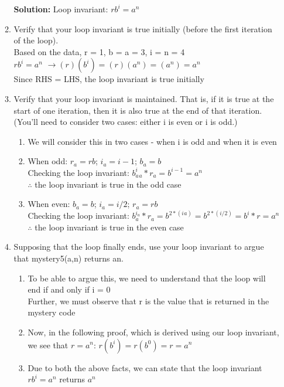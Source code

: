 \documentclass[11pt]{article}
\begin{document}
\begin{enumerate}
\begin{enumerate}
        \textbf{Solution:} Loop invariant: $rb^{i} = a^n$ \\
        
        \item Verify that your loop invariant is true initially (before the first iteration of the loop).
        \\Based on the data, r = 1, b = a = 3, i = n = 4\\
        $rb^{i} = a^n$ $\rightarrow (r)(b^{i}) = (r)(a^n) = (a^n) = a^n$\\
        Since RHS = LHS, the loop invariant is true initially
        

        \item Verify that your loop invariant is maintained. That is, if it is true at the start of one iteration, then it is also true at the end of that iteration. (You'll need to consider two cases: either i is even or i is odd.)
        \begin{enumerate}
            \item We will consider this in two cases - when i is odd and when it is even
            \item When odd: $r_{a} = rb$; $i_{a} = i - 1$; $b_{a} = b$ \\
            Checking the loop invariant: $b_{a}^i_{a} * r_{a} = b^{i-1} = a^n$\\
            $\therefore$ the loop invariant is true in the odd case
            
            \item When even: $b_{a} = b$; $i_{a} = i/2$; $r_{a} = rb$\\
            Checking the loop invariant: $b_{a}^{i_{a}} * r_{a} = b^{2*(i_{}a)} = b^{2*(i/2)} = b^i*r =  a^n$\\
            $\therefore$ the loop invariant is true in the even case
        \end{enumerate}

        \item Supposing that the loop finally ends, use your loop invariant to argue that mystery5(a,n) returns an.
        \begin{enumerate}
            \item To be able to argue this, we need to understand that the loop will end if and only if i = 0\\
            Further, we must observe that r is the value that is returned in the mystery code
            \item Now, in the following proof, which is derived using our loop invariant, we see that $r = a^n$: $r(b^i) = r(b^0) = r = a^n$\\
            \item Due to both the above facts, we can state that the loop invariant $rb^{i} = a^n$ returns $a^n$
        \end{enumerate}


\end{enumerate}
\end{enumerate}
\end{document}
